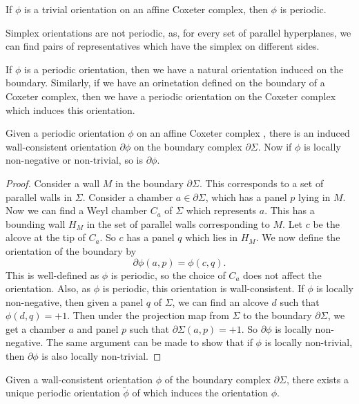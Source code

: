 \documentclass[11pt]{article}
\begin{document}
\begin{example}
    If $\phi$ is a trivial orientation on an affine Coxeter complex, then $\phi$ is periodic. 
\end{example}

\begin{example}
    Simplex orientations are not periodic, as, for every set of parallel hyperplanes, we can find pairs of representatives which have the simplex on different sides.
\end{example}

If $\phi$ is a periodic orientation, then we have a natural orientation induced on the boundary. Similarly, if we have an orinetation defined on the boundary of a Coxeter complex, then we have a periodic orientation on the Coxeter complex which induces this orientation. 

\begin{lemma}\cite[p.125]{SHA}
    Given a periodic orientation $\phi$ on an affine Coxeter complex \sg, there is an induced wall-consistent orientation $\partial\phi$ on the boundary complex $\partial\Sigma$. Now if $\phi$ is locally non-negative or non-trivial, so is $\partial\phi$. 
\end{lemma}

\begin{proof}
    Consider a wall $M$ in the boundary $\partial\Sigma$. This corresponds to a set of parallel walls in $\Sigma$. Consider a chamber $a\in \partial\Sigma$, which has a panel $p$ lying in $M$. Now we can find a Weyl chamber $C_a$ of $\Sigma$ which represents $a$. This has a bounding wall $H_M$ in the set of parallel walls corresponding to $M$. Let $c$ be the alcove at the tip of $C_a$. So $c$ has a panel $q$ which lies in $H_M$. We now define the orientation of the boundary by 
    \[\partial \phi (a,p)= \phi (c,q).\]
    This is well-defined as $\phi$ is periodic, so the choice of $C_a$ does not affect the orientation. Also, as $\phi$ is periodic, this orientation is wall-consistent. 
    If $\phi$ is locally non-negative, then given a panel $q$ of $\Sigma$, we can find an alcove $d$ such that $\phi(d,q)=+1$. Then under the projection map from $\Sigma$ to the boundary $\partial\Sigma$, we get a chamber $a$ and panel $p$ such that $\partial\Sigma(a,p)=+1$. So $\partial\phi$ is locally non-negative. The same argument can be made to show that if $\phi$ is locally non-trivial, then $\partial\phi$ is also locally non-trivial. 
\end{proof}


\begin{lemma}
    Given a wall-consistent orientation $\phi$ of the boundary complex $\partial\Sigma$, there exists a unique periodic orientation $\tilde{\phi}$ of \sg which induces the orientation $\phi$. 
\end{lemma}
\end{document}
